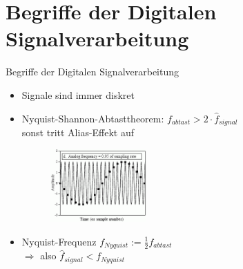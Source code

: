 \section{Begriffe der Digitalen Signalverarbeitung}
\begin{frame}{Begriffe der Digitalen Signalverarbeitung}
	\begin{itemize}
		\vspace{0.75em}
		\item Signale sind immer diskret \vspace{0.5em}
		\item Nyquist-Shannon-Abtasttheorem: $f_{abtast} > 2 \cdot \hat{f}_{signal}$ 
		\\ sonst tritt Alias-Effekt auf \vspace{0.5em}
		\begin{figure}
			\raggedright
			\includegraphics[width=0.35\textwidth]{images/alias-effekt2.png}
		\end{figure}
		\item Nyquist-Frequenz $f_{Nyquist} := \frac{1}{2} f_{abtast}$
		\\ $\Rightarrow$ also $\hat{f}_{signal} < f_{Nyquist}$  \vspace{0.5em}
	\end{itemize}
\end{frame}

 
